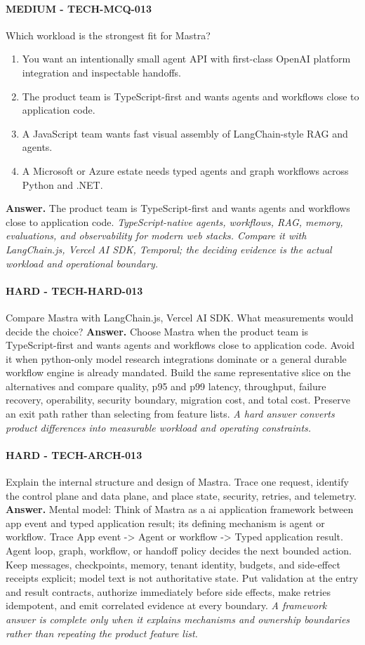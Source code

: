 \paragraph{MEDIUM - TECH-MCQ-013} Which workload is the strongest fit for Mastra?
\begin{enumerate}[label=\Alph*.]
\item You want an intentionally small agent API with first-class OpenAI platform integration and inspectable handoffs.
\item The product team is TypeScript-first and wants agents and workflows close to application code.
\item A JavaScript team wants fast visual assembly of LangChain-style RAG and agents.
\item A Microsoft or Azure estate needs typed agents and graph workflows across Python and .NET.
\end{enumerate}
\textbf{Answer.} The product team is TypeScript-first and wants agents and workflows close to application code.
\textit{TypeScript-native agents, workflows, RAG, memory, evaluations, and observability for modern web stacks. Compare it with LangChain.js, Vercel AI SDK, Temporal; the deciding evidence is the actual workload and operational boundary.}
\paragraph{HARD - TECH-HARD-013} Compare Mastra with LangChain.js, Vercel AI SDK. What measurements would decide the choice?
\textbf{Answer.} Choose Mastra when the product team is TypeScript-first and wants agents and workflows close to application code. Avoid it when python-only model research integrations dominate or a general durable workflow engine is already mandated. Build the same representative slice on the alternatives and compare quality, p95 and p99 latency, throughput, failure recovery, operability, security boundary, migration cost, and total cost. Preserve an exit path rather than selecting from feature lists.
\textit{A hard answer converts product differences into measurable workload and operating constraints.}
\paragraph{HARD - TECH-ARCH-013} Explain the internal structure and design of Mastra. Trace one request, identify the control plane and data plane, and place state, security, retries, and telemetry.
\textbf{Answer.} Mental model: Think of Mastra as a ai application framework between app event and typed application result; its defining mechanism is agent or workflow. Trace App event -> Agent or workflow -> Typed application result. Agent loop, graph, workflow, or handoff policy decides the next bounded action. Keep messages, checkpoints, memory, tenant identity, budgets, and side-effect receipts explicit; model text is not authoritative state. Put validation at the entry and result contracts, authorize immediately before side effects, make retries idempotent, and emit correlated evidence at every boundary.
\textit{A framework answer is complete only when it explains mechanisms and ownership boundaries rather than repeating the product feature list.}
